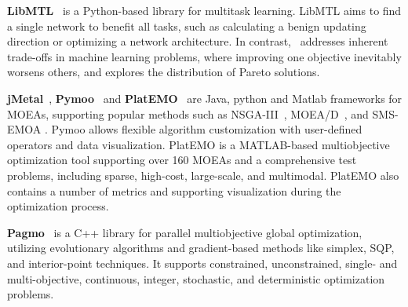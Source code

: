 \textbf{LibMTL}~\cite{lin2023libmtl} is a Python-based library for multitask learning. LibMTL aims to find a single network to benefit all tasks, such as calculating a benign updating direction or optimizing a network architecture. In contrast, \algoname~addresses inherent trade-offs in machine learning problems, where improving one objective inevitably worsens others, and explores the distribution of Pareto solutions.

\textbf{jMetal}~\cite{jMetal}, \textbf{Pymoo}~\cite{pymoo} and \textbf{PlatEMO}~\cite{tian2017platemo} are Java, python and Matlab frameworks for MOEAs, supporting popular methods such as NSGA-III~\cite{nsga31,nsga32}, MOEA/D~\cite{zhang2007moea}, and SMS-EMOA \cite{beume2007sms}. Pymoo allows flexible algorithm customization with user-defined operators and data visualization. PlatEMO is a MATLAB-based multiobjective optimization tool supporting over 160 MOEAs and a comprehensive test problems, including sparse, high-cost, large-scale, and multimodal. PlatEMO also contains a number of metrics and supporting visualization during the optimization process. 

\textbf{Pagmo}~\cite{Biscani2020} is a C++ library for parallel multiobjective global optimization, utilizing evolutionary algorithms and gradient-based methods like simplex, SQP, and interior-point techniques. It supports constrained, unconstrained, single- and multi-objective, continuous, integer, stochastic, and deterministic optimization problems.

